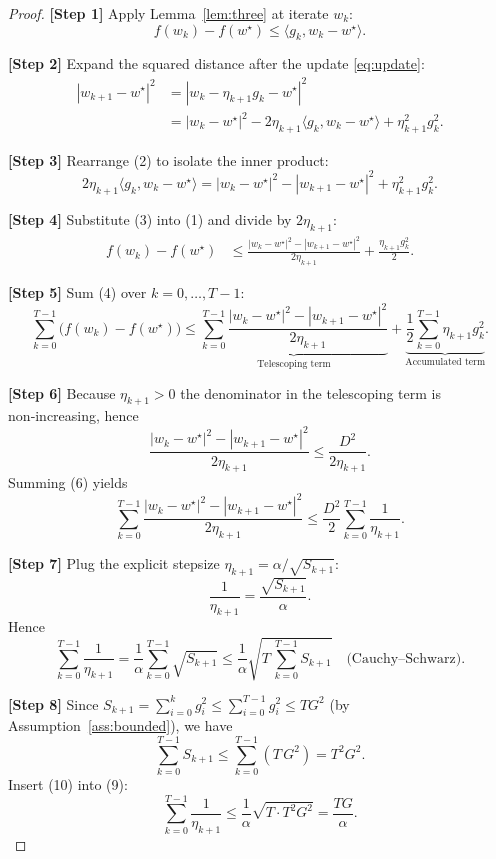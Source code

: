 \documentclass{article}
\begin{document}
\begin{proof}
\textbf{[Step 1]}  Apply Lemma~\ref{lem:three} at iterate $w_k$:
\[
f(w_k)-f(w^\star) \le \langle g_k, w_k-w^\star\rangle .
\tag{1}
\]

\textbf{[Step 2]}  Expand the squared distance after the update \eqref{eq:update}:
\[
\begin{aligned}
|w_{k+1}-w^\star|^{2}
&=|w_k-\eta_{k+1}g_k-w^\star|^{2}\\
&=|w_k-w^\star|^{2}
   -2\eta_{k+1}\langle g_k,w_k-w^\star\rangle
   +\eta_{k+1}^{2}g_k^{2}.
\end{aligned}
\tag{2}
\]

\textbf{[Step 3]}  Rearrange (2) to isolate the inner product:
\[
2\eta_{k+1}\langle g_k,w_k-w^\star\rangle
   =|w_k-w^\star|^{2}-|w_{k+1}-w^\star|^{2}
     +\eta_{k+1}^{2}g_k^{2}.
\tag{3}
\]

\textbf{[Step 4]}  Substitute (3) into (1) and divide by $2\eta_{k+1}$:
\[
\begin{aligned}
f(w_k)-f(w^\star)
&\le \frac{|w_k-w^\star|^{2}-|w_{k+1}-w^\star|^{2}}{2\eta_{k+1}}
     +\frac{\eta_{k+1}g_k^{2}}{2}.
\end{aligned}
\tag{4}
\]

\textbf{[Step 5]}  Sum (4) over $k=0,\dots,T-1$:
\[
\sum_{k=0}^{T-1}\bigl(f(w_k)-f(w^\star)\bigr)
\le
\underbrace{\sum_{k=0}^{T-1}
   \frac{|w_k-w^\star|^{2}-|w_{k+1}-w^\star|^{2}}{2\eta_{k+1}}}_{\text{Telescoping term}}
   +\underbrace{\frac12\sum_{k=0}^{T-1}\eta_{k+1}g_k^{2}}_{\text{Accumulated term}}.
\tag{5}
\]

\textbf{[Step 6]}  Because $\eta_{k+1}>0$ the denominator in the telescoping term
is non‑increasing, hence
\[
\frac{|w_k-w^\star|^{2}-|w_{k+1}-w^\star|^{2}}{2\eta_{k+1}}
\le
\frac{D^{2}}{2\eta_{k+1}}.
\tag{6}
\]
Summing (6) yields
\[
\sum_{k=0}^{T-1}
   \frac{|w_k-w^\star|^{2}-|w_{k+1}-w^\star|^{2}}{2\eta_{k+1}}
\le
\frac{D^{2}}{2}\sum_{k=0}^{T-1}\frac{1}{\eta_{k+1}}.
\tag{7}
\]

\textbf{[Step 7]}  Plug the explicit stepsize $\eta_{k+1}= \alpha/\sqrt{S_{k+1}}$:
\[
\frac{1}{\eta_{k+1}} = \frac{\sqrt{S_{k+1}}}{\alpha}.
\tag{8}
\]
Hence
\[
\sum_{k=0}^{T-1}\frac{1}{\eta_{k+1}}
   =\frac{1}{\alpha}\sum_{k=0}^{T-1}\sqrt{S_{k+1}}
   \le \frac{1}{\alpha}\sqrt{T\,\sum_{k=0}^{T-1}S_{k+1}}
   \quad\text{(Cauchy–Schwarz)}.
\tag{9}
\]

\textbf{[Step 8]}  Since $S_{k+1}= \sum_{i=0}^{k}g_i^{2}\le \sum_{i=0}^{T-1}g_i^{2}\le TG^{2}$
(by Assumption~\ref{ass:bounded}), we have
\[
\sum_{k=0}^{T-1}S_{k+1}
   \le \sum_{k=0}^{T-1}(T\,G^{2}) = T^{2}G^{2}.
\tag{10}
\]
Insert (10) into (9):
\[
\sum_{k=0}^{T-1}\frac{1}{\eta_{k+1}}
   \le \frac{1}{\alpha}\sqrt{T\cdot T^{2}G^{2}}
   = \frac{T G}{\alpha}.
\tag{11}
\]


\end{proof}
\end{document}
